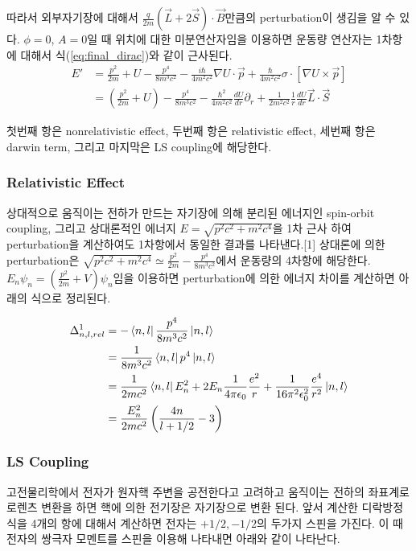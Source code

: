 \documentclass[%
 reprint,
 amsmath,amssymb,
 aps,
]{revtex4-2}
\begin{document}
따라서 외부자기장에 대해서 $\frac{q}{2m}(\vec{L}+2\vec{S})\cdot\vec{B}$만큼의 perturbation이 생김을 알 수 있다. $\phi =0$, $A=0$일 때 위치에 대한 미분연산자임을 이용하면 운동량 연산자는 1차항에 대해서 식(\ref{eq:final_dirac})와 같이 근사된다.
\begin{align}
	E' &= \frac{p^{2}}{2m}+U -\frac{p^{4}}{8m^{3}c^{2}}-\frac{i\hbar}{4m^{2}c^{2}}\nabla U \cdot\vec{p}+\frac{\hbar}{4m^{2}c^{2}}\sigma \cdot[\nabla U \times \vec{p}]\\
	&=\left(\frac{p^{2}}{2m}+U\right) -\frac{p^{4}}{8m^{3}c^{2}}-\frac{\hbar^{2}}{4m^{2}c^{2}}\frac{dU}{dr}\partial_{r} + \frac{1}{2m^{2}c^{2}}\frac{1}{r}\frac{dU}{dr}\vec{L}\cdot\vec{S}\label{eq:final_dirac}
\end{align}

첫번째 항은 nonrelativistic effect, 두번째 항은 relativistic effect, 세번째 항은 darwin term, 그리고 마지막은 LS coupling에 해당한다.

\subsubsection{\label{sec:level2}Relativistic Effect}
상대적으로 움직이는 전하가 만드는 자기장에 의해 분리된 에너지인 spin-orbit coupling, 그리고 상대론적인 에너지 $E=\sqrt{p^{2}c^{2}+m^{2}c^{4}}$을 1차 근사 하여 perturbation을 계산하여도 1차항에서 동일한 결과를 나타낸다.[1] 상대론에 의한 perturbation은 $\sqrt{p^{2}c^{2}+m^{2}c^{4}} \simeq \frac{p^{2}}{2m} - \frac{p^{4}}{8m^{3}c^{2}}$에서 운동량의 4차항에 해당한다. $E_{n}\psi_{n} = (\frac{p^{2}}{2m}+V)\psi_{n}$임을 이용하면 perturbation에 의한 에너지 차이를 계산하면 아래의 식으로 정리된다.

\begin{align}
	\Delta^{1}_{n,l,rel} &= - \bra{n,l}\frac{p^{4}}{8m^{3}c^{2}}\ket{n,l}\\
	&= \frac{1}{8m^{3}c^{2}}\bra{n,l}p^{4}\ket{n,l}\\
	&= \frac{1}{2mc^{2}}\bra{n,l}E_{n}^{2} + 2E_{n}\frac{1}{4\pi \epsilon_{0}}\frac{e^{2}}{r}+ \frac{1}{16\pi^{2} \epsilon_{0}^{2}}\frac{e^{4}}{r^{2}}\ket{n,l}\\
	&= \frac{E^{2}_{n}}{2mc^{2}}\left( \frac{4n}{l+1/2}-3 \right)
\end{align}

\subsubsection{\label{sec:level2}LS Coupling}
고전물리학에서 전자가 원자핵 주변을  공전한다고 고려하고 움직이는 전하의 좌표계로 로렌츠 변환을 하면 핵에 의한 전기장은 자기장으로 변환 된다. 앞서 계산한 디락방정식을 4개의 항에 대해서 계산하면 전자는 $+1/2, -1/2$의 두가지 스핀을 가진다. 이 때 전자의 쌍극자 모멘트를 스핀을 이용해 나타내면 아래와 같이 나타난다.
\end{document}
